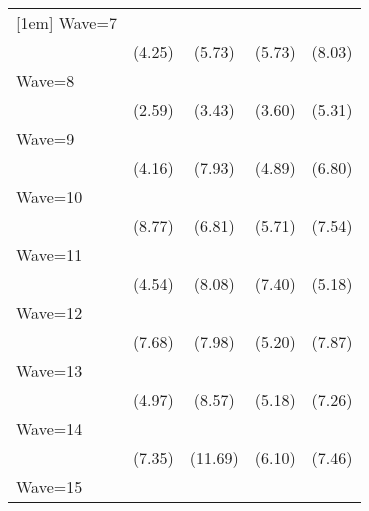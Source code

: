 {\begin{tabular}{l*{4}{c}}
[1em]
Wave=7              &            \sym{***}&            \sym{***}&            \sym{***}&            \sym{***}\\
                    &      (4.25)         &      (5.73)         &      (5.73)         &      (8.03)         \\
[1em]
Wave=8              &            \sym{**} &            \sym{***}&            \sym{***}&            \sym{***}\\
                    &      (2.59)         &      (3.43)         &      (3.60)         &      (5.31)         \\
[1em]
Wave=9              &            \sym{***}&            \sym{***}&            \sym{***}&            \sym{***}\\
                    &      (4.16)         &      (7.93)         &      (4.89)         &      (6.80)         \\
[1em]
Wave=10             &            \sym{***}&            \sym{***}&            \sym{***}&            \sym{***}\\
                    &      (8.77)         &      (6.81)         &      (5.71)         &      (7.54)         \\
[1em]
Wave=11             &            \sym{***}&            \sym{***}&            \sym{***}&            \sym{***}\\
                    &      (4.54)         &      (8.08)         &      (7.40)         &      (5.18)         \\
[1em]
Wave=12             &            \sym{***}&            \sym{***}&            \sym{***}&            \sym{***}\\
                    &      (7.68)         &      (7.98)         &      (5.20)         &      (7.87)         \\
[1em]
Wave=13             &            \sym{***}&            \sym{***}&            \sym{***}&            \sym{***}\\
                    &      (4.97)         &      (8.57)         &      (5.18)         &      (7.26)         \\
[1em]
Wave=14             &            \sym{***}&            \sym{***}&            \sym{***}&            \sym{***}\\
                    &      (7.35)         &     (11.69)         &      (6.10)         &      (7.46)         \\
[1em]
Wave=15             &            \sym{***}&            \sym{***}&            \sym{***}&            \sym{***}\\

\end{tabular}}
